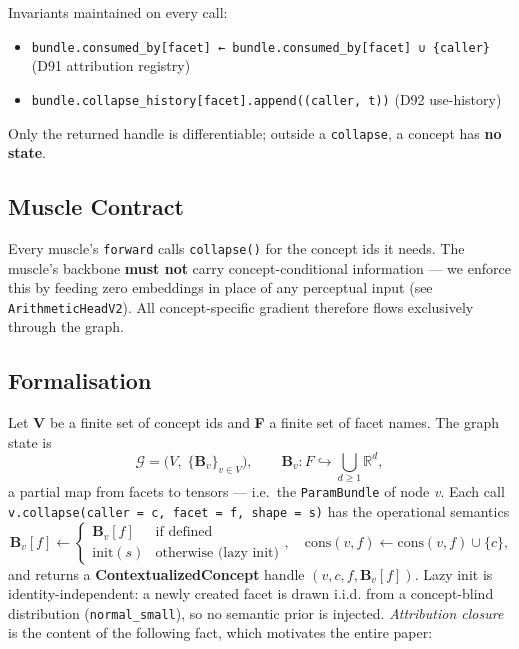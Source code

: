 Invariants maintained on every call:

\begin{itemize}
\tightlist
\item
  \texttt{bundle.consumed\_by{[}facet{]}\ ←\ bundle.consumed\_by{[}facet{]}\ ∪\ \{caller\}}
  (D91 attribution registry)
\item
  \texttt{bundle.collapse\_history{[}facet{]}.append((caller,\ t))}
  (D92 use-history)
\end{itemize}

Only the returned handle is differentiable; outside a \texttt{collapse}, a
concept has \textbf{no state}.

\subsection{Muscle Contract}

Every muscle's \texttt{forward} calls \texttt{collapse()} for the concept ids it
needs. The muscle's backbone \textbf{must not} carry concept-conditional
information --- we enforce this by feeding zero embeddings in place of any
perceptual input (see \texttt{ArithmeticHeadV2}). All concept-specific
gradient therefore flows exclusively through the graph.

\subsection{Formalisation}

Let \textbf{V} be a finite set of concept ids and \textbf{F} a finite set of
facet names. The graph state is
\[
  \mathcal{G} = \bigl(V,\; \{ \mathbf{B}_v \}_{v \in V} \bigr),\qquad
  \mathbf{B}_v : F \hookrightarrow \bigcup_{d\ge 1} \mathbb{R}^{d},
\]
a partial map from facets to tensors --- i.e.~the \texttt{ParamBundle} of
node \emph{v}. Each call
\texttt{v.collapse(caller\ =\ c,\ facet\ =\ f,\ shape\ =\ s)} has the operational
semantics
\[
  \mathbf{B}_v[f] \longleftarrow
    \begin{cases}
      \mathbf{B}_v[f] & \text{if defined} \\
      \mathrm{init}(s) & \text{otherwise (lazy init)}
    \end{cases},
  \quad
  \mathrm{cons}(v, f) \leftarrow \mathrm{cons}(v, f) \cup \{c\},
\]
and returns a \textbf{ContextualizedConcept} handle
\((v, c, f, \mathbf{B}_v[f])\). Lazy init is identity-independent: a
newly created facet is drawn i.i.d. from a concept-blind distribution
(\texttt{normal\_small}), so no semantic prior is injected. \emph{Attribution
closure} is the content of the following fact, which motivates the
entire paper:

